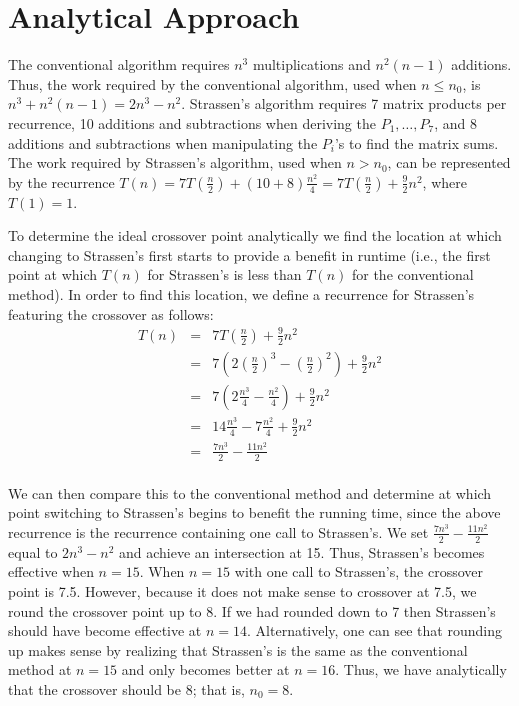 \documentclass[solution, letterpaper]{cs121}
\begin{document}

\section*{Analytical Approach}

\hspace{4mm} The conventional algorithm requires $n^3$ multiplications and $n^2(n-1)$ additions. Thus, the work required by the conventional algorithm, used when $n \leq n_0$, is $n^3 + n^2(n-1) = 2n^3 - n^2$. Strassen's algorithm requires 7 matrix products per recurrence, 10 additions and subtractions when deriving the $P_1, \ldots, P_7$, and 8 additions and subtractions when manipulating the $P_i$'s to find the matrix sums. The work required by Strassen's algorithm, used when $n > n_0$, can be represented by the recurrence $T(n) = 7T(\frac{n}{2}) + (10+8)\frac{n^2}{4} = 7T(\frac{n}{2}) + \frac{9}{2}n^2$, where $T(1) = 1$.

To determine the ideal crossover point analytically we find the location at which changing to Strassen's first starts to provide a benefit in runtime (i.e., the first point at which $T(n)$ for Strassen's is less than $T(n)$ for the conventional method). In order to find this location, we define a recurrence for Strassen's featuring the crossover as follows:
\[
\begin{array}{rcl}
T(n) &=& 7T(\frac{n}{2}) + \frac{9}{2}n^2\\
&=& 7(2(\frac{n}{2})^3 - (\frac{n}{2})^2) + \frac{9}{2}n^2\\
&=& 7(2\frac{n^3}{4} - \frac{n^2}{4}) + \frac{9}{2}n^2\\
&=& 14\frac{n^3}{4} - 7\frac{n^2}{4} + \frac{9}{2}n^2\\
&=& \frac{7n^3}{2} - \frac{11n^2}{2}\\
\end{array}
\]

We can then compare this to the conventional method and determine at which point switching to Strassen's begins to benefit the running time, since the above recurrence is the recurrence containing one call to Strassen's. We set $\frac{7n^3}{2} - \frac{11n^2}{2}$ equal to $2n^3 - n^2$ and achieve an intersection at 15. Thus, Strassen's becomes effective when $n = 15$. When $n=15$ with one call to Strassen's, the crossover point is 7.5. However, because it does not make sense to crossover at 7.5, we round the crossover point up to 8. If we had rounded down to 7 then Strassen's should have become effective at $n = 14$. Alternatively, one can see that rounding up makes sense by realizing that Strassen's is the same as the conventional method at $n=15$ and only becomes better at $n = 16$. Thus, we have analytically that the crossover should be 8; that is, $n_0 = 8$.
\end{document}
